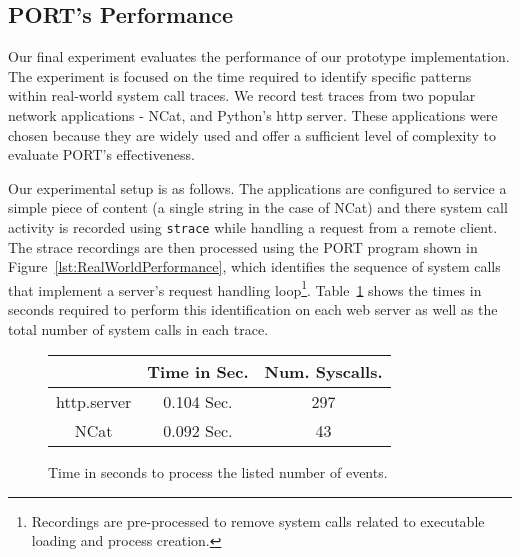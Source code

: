 \subsection{PORT's Performance}

Our final experiment evaluates the performance of our prototype implementation.
The experiment is focused on the time required
to identify specific
patterns within real-world system call traces.
We record test traces
from two popular network applications -
NCat,
and
Python's http server.
These applications
were chosen because they are widely used and
offer a sufficient level of complexity to evaluate
PORT's effectiveness.

Our experimental setup is as follows.  The applications are configured to service
a simple piece of content (a single string in the case of NCat) and there system call activity is
recorded using {\tt strace} while handling a request from a remote client.
The strace recordings are then processed using the PORT program shown in
Figure~\ref{lst:RealWorldPerformance},  which
identifies the sequence of system calls that implement
a server's request handling loop\footnote{Recordings are pre-processed to remove system calls
related to executable loading and process creation.}.  Table~\ref{tbl:RealWorldPerformance}
shows the times in seconds required to perform this identification on each
web server as well as the total number of system calls in each trace.

\begin{figure}
  \begin{tabular}{|c|c|c}
                & Time in Sec. & Num. Syscalls.\\
              \hline
  http.server   & 0.104 Sec.   & 297   \\
  NCat          & 0.092 Sec.   & 43      \\
\end{tabular}
\caption{Time in seconds to process the listed number of events.}
\label{tbl:RealWorldPerformance}
\end{figure}

